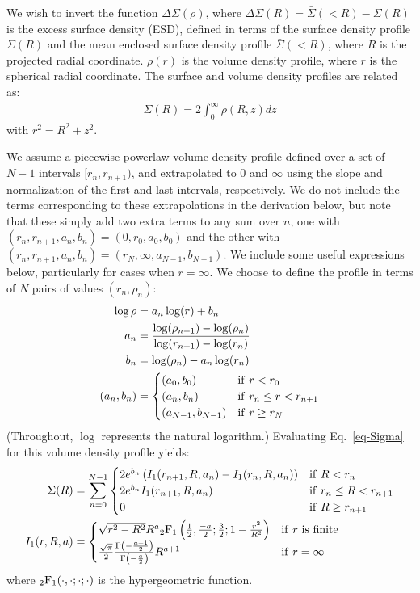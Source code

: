 \documentclass{article}
\begin{document}
We wish to invert the function $\Delta\Sigma(\rho)$, where $\Delta\Sigma(R) = \bar{\Sigma}(<R) - \Sigma(R)$ is the excess surface density (ESD), defined in terms of the surface density profile $\Sigma(R)$ and the mean enclosed surface density profile $\bar{\Sigma}(<R)$, where $R$ is the projected radial coordinate. $\rho(r)$ is the volume density profile, where $r$ is the spherical radial coordinate. The surface and volume density profiles are related as:
\begin{align}
  \Sigma(R) = 2\int_0^\infty\rho(R, z)dz\label{eq-Sigma}
\end{align}
with $r^2 = R^2 + z^2$.

We assume a piecewise powerlaw volume density profile defined over a set of $N-1$ intervals $[r_n, r_{n+1})$, and extrapolated to $0$ and $\infty$ using the slope and normalization of the first and last intervals, respectively. We do not include the terms corresponding to these extrapolations in the derivation below, but note that these simply add two extra terms to any sum over $n$, one with $(r_n,r_{n+1},a_n,b_n) = (0, r_0, a_0, b_0)$ and the other with $(r_n,r_{n+1},a_n,b_n) = (r_N, \infty, a_{N-1}, b_{N-1})$. We include some useful expressions below, particularly for cases when $r=\infty$. We choose to define the profile in terms of $N$ pairs of values $(r_n,\rho_n)$:
\begin{align}
  \log\rho &= a_n \log(r) + b_n \\
  a_n &= \frac{\log(\rho_{n+1})-\log(\rho_n)}{\log(r_{n+1})-\log(r_n)}\\
  b_n &= \log(\rho_n) - a_n\log(r_n)\\
  (a_n, b_n) &=
  \begin{cases}
    (a_0, b_0) & {\rm if}\ r < r_0\\
    (a_n, b_n) & {\rm if}\ r_n \leq r < r_{n+1}\\
    (a_{N-1}, b_{N-1}) & {\rm if}\ r \geq r_N
  \end{cases}
\end{align}
(Throughout, $\log$ represents the natural logarithm.) Evaluating Eq.~\ref{eq-Sigma} for this volume density profile yields:
\begin{align}
  \Sigma(R) &= \sum_{n=0}^{N-1}
  \begin{cases}
    2e^{b_n}\left(I_1(r_{n+1}, R, a_n) - I_1(r_n, R, a_n)\right) & {\rm if}\ R < r_n\\
    2e^{b_n}I_1(r_{n+1}, R, a_n) & {\rm if}\ r_n \leq R < r_{n+1}\\
    0 & {\rm if}\ R \geq r_{n+1}\\
  \end{cases} \label{eq-Sigma-discrete}\\
  I_1(r, R, a) &=
  \begin{cases}
    \sqrt{r^2-R^2}R^a{}_2{\rm F}_1\left(\frac{1}{2},\frac{-a}{2};\frac{3}{2};1-\frac{r^2}{R^2}\right) & {\rm if}\ r\ {\rm is}\ {\rm finite}\\
    \frac{\sqrt{\pi}}{2}\frac{\Gamma\left(-\frac{a+1}{2}\right)}{\Gamma\left(-\frac{a}{2}\right)}R^{a+1} & {\rm if}\ r = \infty
  \end{cases}
\end{align}
where ${}_2{\rm F}_1(\cdot,\cdot;\cdot;\cdot)$ is the hypergeometric function.
\end{document}
